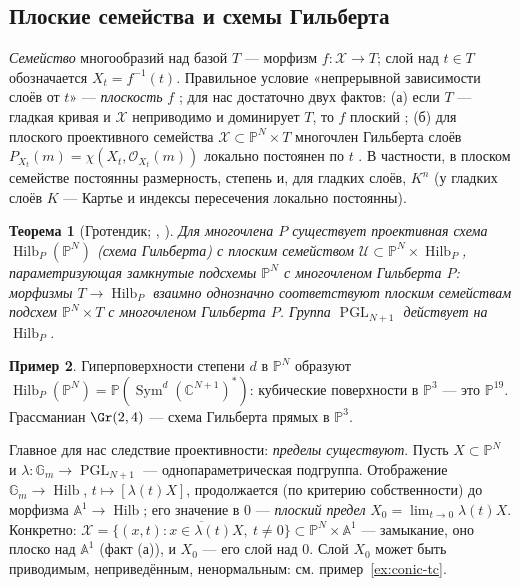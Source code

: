 \documentclass[11pt,a4paper]{article}
\theoremstyle{plain}
\newtheorem{theorem}{Теорема}[section]
\theoremstyle{definition}
\newtheorem{example}[theorem]{Пример}
\theoremstyle{remark}
\renewcommand{\C}{\mathbb{C}}
\newcommand{\PP}{\mathbb{P}}
\newcommand{\A}{\mathbb{A}}
\newcommand{\Gm}{\mathbb{G}_m}
\newcommand{\cO}{\mathcal{O}}
\newcommand{\cX}{\mathcal{X}}
\DeclareMathOperator{\PGL}{PGL}
\DeclareMathOperator{\Sym}{Sym}
\DeclareMathOperator{\Hilb}{Hilb}
\begin{document}
\subsection{Плоские семейства и схемы Гильберта}

\emph{Семейство} многообразий над базой $T$ --- морфизм $f\colon\cX\to T$; слой над $t\in T$
обозначается $X_t=f^{-1}(t)$. Правильное условие «непрерывной зависимости слоёв от $t$» ---
\emph{плоскость} $f$ \cite[III.9]{Ha}; для нас достаточно двух фактов: (а) если $T$ --- гладкая
кривая и $\cX$ неприводимо и доминирует $T$, то $f$ плоский \cite[III.9.7]{Ha}; (б) для плоского
проективного семейства $\cX\subset\PP^N\times T$ многочлен Гильберта слоёв
$P_{X_t}(m)=\chi(X_t,\cO_{X_t}(m))$ локально постоянен по $t$ \cite[III.9.9]{Ha}. В частности,
в плоском семействе постоянны размерность, степень и, для гладких слоёв, $K^n$ (у гладких слоёв
$K$ --- Картье и индексы пересечения локально постоянны).

\begin{theorem}[{Гротендик; \cite[гл.~1]{HM}, \cite[I.1]{Kol96}}]\label{thm:Hilb}
Для многочлена $P$ существует проективная схема $\Hilb_P(\PP^N)$ (\emph{схема Гильберта}) с
плоским семейством $\mathcal U\subset\PP^N\times\Hilb_P$, параметризующая замкнутые подсхемы
$\PP^N$ с многочленом Гильберта $P$: морфизмы $T\to\Hilb_P$ взаимно однозначно соответствуют
плоским семействам подсхем $\PP^N\times T$ с многочленом Гильберта $P$. Группа $\PGL_{N+1}$
действует на $\Hilb_P$.
\end{theorem}

\begin{example}
Гиперповерхности степени $d$ в $\PP^N$ образуют $\Hilb_P(\PP^N)=\PP(\Sym^d(\C^{N+1})^*)$: кубические
поверхности в $\PP^3$ --- это $\PP^{19}$. Грассманиан $\Gr(2,4)$ --- схема Гильберта прямых в $\PP^3$.
\end{example}

Главное для нас следствие проективности: \emph{пределы существуют}. Пусть $X\subset\PP^N$ и
$\lambda\colon\Gm\to\PGL_{N+1}$ --- однопараметрическая подгруппа. Отображение
$\Gm\to\Hilb$, $t\mapsto[\lambda(t)X]$, продолжается (по критерию собственности) до морфизма
$\A^1\to\Hilb$; его значение в $0$ --- \emph{плоский предел} $X_0=\lim_{t\to0}\lambda(t)X$.
Конкретно: $\cX=\overline{\{(x,t):x\in\lambda(t)X,\ t\ne0\}}\subset\PP^N\times\A^1$ --- замыкание,
оно плоско над $\A^1$ (факт (а)), и $X_0$ --- его слой над $0$. Слой $X_0$ может быть приводимым,
неприведённым, ненормальным: см. пример~\ref{ex:conic-tc}.
\end{document}

